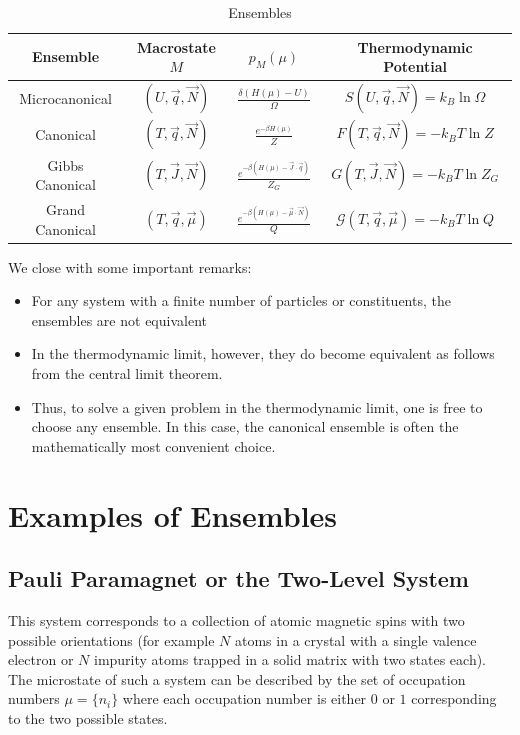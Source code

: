 \documentclass[12pt, a4paper, oneside, openright, titlepage]{book}
\begin{document}
\begin{table}[H]
    \centering
    \caption{Ensembles}
    \begin{tabular}{c|ccc}
        Ensemble & Macrostate $M$ & $p_M(\mu)$ & Thermodynamic Potential \\ \hline
        Microcanonical & $(U,\vec{q},\vec{N})$ & $\frac{\delta(H(\mu) - U)}{\Omega}$ & $S(U,\vec{q},\vec{N}) = k_B\ln \Omega$ \\
        Canonical & $(T,\vec{q},\vec{N})$ & $\frac{e^{-\beta H(\mu)}}{Z}$ & $F(T,\vec{q},\vec{N}) = -k_BT\ln Z$ \\
        Gibbs Canonical & $(T,\vec{J},\vec{N})$ & $\frac{e^{-\beta(H(\mu) - \vec{J}\cdot \vec{q})}}{Z_G}$ & $G(T,\vec{J},\vec{N}) = -k_BT\ln Z_G$ \\
        Grand Canonical & $(T,\vec{q},\vec{\mu})$ & $\frac{e^{-\beta(H(\mu)-\vec{\mu}\cdot \vec{N})}}{Q}$ & $\mathcal{G}(T,\vec{q},\vec{\mu}) = -k_BT\ln Q$ \\
    \end{tabular}
\end{table}

We close with some important remarks:

\begin{rmk}
    \leavevmode
    \begin{itemize}
        \item For any system with a finite number of particles or constituents, the ensembles are not equivalent
        \item In the thermodynamic limit, however, they do become equivalent as follows from the central limit theorem.
        \item Thus, to solve a given problem in the thermodynamic limit, one is free to choose any ensemble. In this case, the canonical ensemble is often the mathematically most convenient choice.
    \end{itemize}
\end{rmk}


\section{Examples of Ensembles}


\subsection{Pauli Paramagnet or the Two-Level System}

This system corresponds to a collection of atomic magnetic spins with two possible orientations (for example $N$ atoms in a crystal with a single valence electron or $N$ impurity atoms trapped in a solid matrix with two states each). The microstate of such a system can be described by the set of occupation numbers $\mu = \{n_i\}$ where each occupation number is either $0$ or $1$ corresponding to the two possible states.
\end{document}
